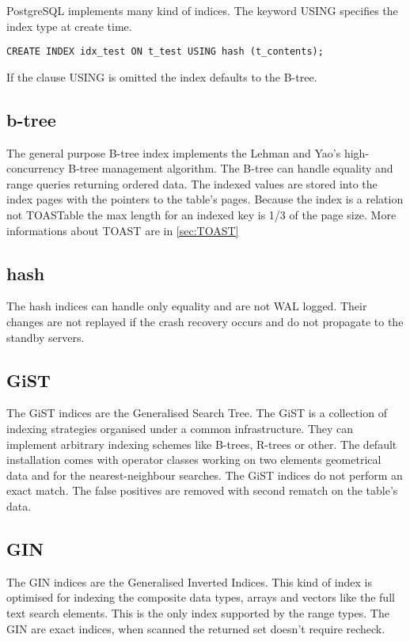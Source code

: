 PostgreSQL implements many kind of indices. The keyword USING specifies the index type at create time.

\begin{lstlisting}[style=pgsql]
 CREATE INDEX idx_test ON t_test USING hash (t_contents);
\end{lstlisting}

If the clause USING is omitted the index defaults to the B-tree.

\subsection{b-tree}
The general purpose B-tree index implements the Lehman and Yao's
high-concurrency B-tree management algorithm. The B-tree can handle equality and range queries
returning ordered data. The indexed values are stored into the index pages with the pointers to the
table's pages. Because the index is a relation not TOASTable the max length for an indexed key is 1/3
of the page size. More informations about TOAST are in \ref{sec:TOAST} \newline

\subsection{hash}
The hash indices can handle only equality and are not WAL logged. Their changes
are not replayed if the crash recovery occurs and do not propagate to the standby servers.\newline

\subsection{GiST}
The GiST indices are the Generalised Search Tree. The GiST is a collection of
indexing strategies organised under a common infrastructure. They can implement arbitrary indexing
schemes like B-trees, R-trees  or other. The default installation comes with operator classes working on
two elements geometrical data and for the nearest-neighbour searches. The GiST indices do not perform an
exact match. The false positives are removed with second rematch on the table's data.\newline

\subsection{GIN}
The GIN indices  are the Generalised Inverted Indices. This kind of index
is optimised for indexing the composite data types, arrays and vectors like the full text search
elements. This is the only index supported by the range types. The GIN are exact indices, when scanned
the returned set doesn't require recheck.

